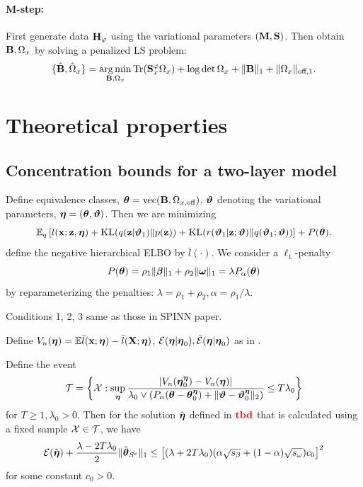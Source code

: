 \documentclass[11pt,letterpaper]{article}
\DeclareMathOperator*{\ve}{vec}
\DeclareMathOperator*{\Tr}{Tr}
\DeclareMathOperator*{\argmin}{arg\,min}
\DeclareMathOperator*{\kl}{\text{KL}}
\DeclareMathOperator*{\rtbd}{{\colrbf tbd}}
\numberwithin{equation}{section}
\begin{document}
\paragraph{M-step:} First generate data ${\mathbf{H}}_\varphi$ using the variational parameters $({\mathbf{M}}, {\mathbf{S}})$. Then obtain ${\mathbf{B}},\Omega_x$ by solving a penalized LS  problem:
%
$$
\{ \hat \bfB, \hat \Omega_x \} = \argmin_{\bfB,\Omega_x} \Tr(\bfS^\varphi_x \Omega_x) + \log \det \Omega_x + \| \bfB \|_1 + \| \Omega_x \|_{\text{off},1}.
$$
%

\section{Theoretical properties}

\subsection{Concentration bounds for a two-layer model}
Define equivalence classes, $\bftheta = \ve (\bfB, \Omega_{x,\text{off}})$, ${\boldsymbol{\vartheta}}$ denoting the variational parameters, ${\boldsymbol{\eta}} = ({\boldsymbol{\theta}}, {\boldsymbol{\vartheta}})$. Then we are minimizing
%
$$
\BE_q \left[ l(\bfx; \bfz, \bfeta) + \kl(q(\bfz| \bfvt_1) \| p(\bfz)) +
\kl( r(\bfvt_1| \bfz; \bfvt) \| q(\bfvt_1; \bfvt)) \right] + P( \bftheta ).
$$
%
define the negative hierarchical ELBO by $\bar l(\cdot)$. We consider a $\ell_1$-penalty
%
$$ P({\boldsymbol{\theta}}) = \rho_1 \| {\boldsymbol{\beta}} \|_1 + \rho_2 \| {\boldsymbol{\omega}} \|_1 = \lambda P_\alpha ({\boldsymbol{\theta}}) $$
%
by reparameterizing the penalties: $ \lambda = \rho_1 + \rho_2, \alpha = \rho_1/\lambda$.

Conditions 1, 2, 3 same as those in SPINN paper.

Define $V_n({\boldsymbol{\eta}}) = {\mathbb{E}} \bar l({\bf{x}}; {\boldsymbol{\eta}}) - \bar l({\mathbf{X}}; {\boldsymbol{\eta}})$, ${\cal{E}}({\boldsymbol{\eta}}|{\boldsymbol{\eta}}_0), \bar {{\cal{E}}}({\boldsymbol{\eta}}|{\boldsymbol{\eta}}_0)$ as in \cite{StadlerEtal10}.

\begin{Theorem}\label{thm:thm1}
Define the event
%
$$
{\cal{T}} = \left\{ {\cal{X}}: \sup_{\boldsymbol{\eta}} \frac{ |V_n({\boldsymbol{\eta}}_0^{\boldsymbol{\eta}}) - V_n({\boldsymbol{\eta}})| }{\lambda_0 \vee
(P_\alpha({\boldsymbol{\theta}} - {\boldsymbol{\theta}}_0^{\boldsymbol{\eta}}) + \| {\boldsymbol{\vartheta}} - {\boldsymbol{\vartheta}}_0^{\boldsymbol{\eta}} \|_2) }
\leq T \lambda_0 \right\}
$$
%
for $T \geq 1, \lambda_0 > 0$. Then for the solution $\hat {{\boldsymbol{\eta}}}$ defined in $\rtbd$ that is calculated using a fixed sample ${\cal{X}} \in {\cal{T}}$, we have
%
$$
{\cal{E}}(\hat {{\boldsymbol{\eta}}} ) + \frac{\lambda - 2T\lambda_0}{2} \| \hat {{\boldsymbol{\theta}}}_{S^c} \|_1 \leq
\left[ (\lambda + 2T\lambda_0) (\alpha \sqrt{s_\beta} + (1-\alpha) \sqrt{s_\omega}) c_0 \right]^2
$$
%
for some constant $c_0 > 0$.
\end{Theorem}
\end{document}

